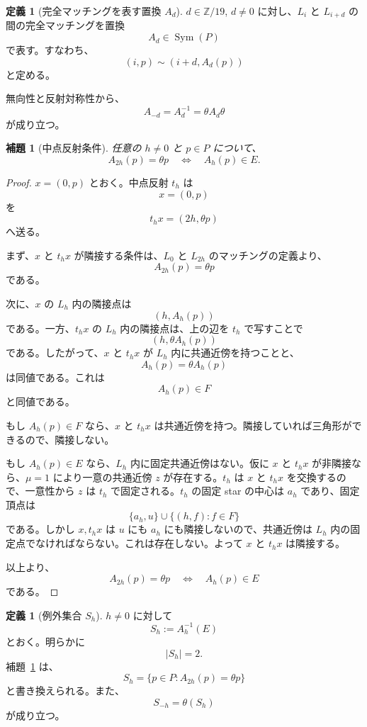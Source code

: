 \documentclass[11pt,a4paper]{article}
\theoremstyle{plain}
\newtheorem{lemma}[theorem]{補題}
\theoremstyle{definition}
\newtheorem{definition}[theorem]{定義}
\theoremstyle{remark}
\DeclareMathOperator{\Sym}{Sym}
\begin{document}
\begin{definition}[完全マッチングを表す置換 $A_d$]
$d \in \mathbb{Z}/19$, $d \neq 0$ に対し、$L_i$ と $L_{i+d}$ の間の完全マッチングを置換
\[
A_d \in \Sym(P)
\]
で表す。すなわち、
\[
(i,p) \sim (i+d, A_d(p))
\]
と定める。

無向性と反射対称性から、
\[
A_{-d} = A_d^{-1} = \theta A_d \theta
\]
が成り立つ。
\end{definition}

\begin{lemma}[中点反射条件]\label{lem:midpoint}
任意の $h \neq 0$ と $p \in P$ について、
\[
A_{2h}(p) = \theta p \quad \Longleftrightarrow \quad A_h(p) \in E.
\]
\end{lemma}

\begin{proof}
$x = (0,p)$ とおく。中点反射 $t_h$ は
\[
x = (0,p)
\]
を
\[
t_h x = (2h, \theta p)
\]
へ送る。

まず、$x$ と $t_h x$ が隣接する条件は、$L_0$ と $L_{2h}$ のマッチングの定義より、
\[
A_{2h}(p) = \theta p
\]
である。

次に、$x$ の $L_h$ 内の隣接点は
\[
(h, A_h(p))
\]
である。一方、$t_h x$ の $L_h$ 内の隣接点は、上の辺を $t_h$ で写すことで
\[
(h, \theta A_h(p))
\]
である。したがって、$x$ と $t_h x$ が $L_h$ 内に共通近傍を持つことと、
\[
A_h(p) = \theta A_h(p)
\]
は同値である。これは
\[
A_h(p) \in F
\]
と同値である。

もし $A_h(p) \in F$ なら、$x$ と $t_h x$ は共通近傍を持つ。隣接していれば三角形ができるので、隣接しない。

もし $A_h(p) \in E$ なら、$L_h$ 内に固定共通近傍はない。仮に $x$ と $t_h x$ が非隣接なら、$\mu = 1$ により一意の共通近傍 $z$ が存在する。$t_h$ は $x$ と $t_h x$ を交換するので、一意性から $z$ は $t_h$ で固定される。$t_h$ の固定 star の中心は $a_h$ であり、固定頂点は
\[
\{a_h, u\} \cup \{(h,f) : f \in F\}
\]
である。しかし $x, t_h x$ は $u$ にも $a_h$ にも隣接しないので、共通近傍は $L_h$ 内の固定点でなければならない。これは存在しない。よって $x$ と $t_h x$ は隣接する。

以上より、
\[
A_{2h}(p) = \theta p \quad \Longleftrightarrow \quad A_h(p) \in E
\]
である。
\end{proof}

\begin{definition}[例外集合 $S_h$]
$h \neq 0$ に対して
\[
S_h := A_h^{-1}(E)
\]
とおく。明らかに
\[
|S_h| = 2.
\]
補題~\ref{lem:midpoint} は、
\[
S_h = \{p \in P : A_{2h}(p) = \theta p\}
\]
と書き換えられる。また、
\[
S_{-h} = \theta(S_h)
\]
が成り立つ。
\end{definition}
\end{document}
